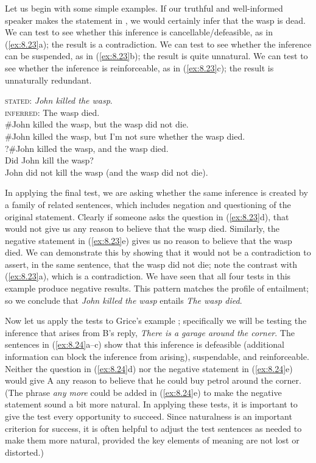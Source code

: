 Let us begin with some simple examples. If our truthful and well-informed speaker makes the statement in , we would certainly infer that the wasp is dead. We can test to see whether this inference is cancellable/defeasible, as in (\ref{ex:8.23}a); the result is a contradiction. We can test to see whether the inference can be suspended, as in (\ref{ex:8.23}b); the result is quite unnatural. We can test to see whether the inference is reinforceable, as in (\ref{ex:8.23}c); the result is unnaturally redundant.


\ea \label{ex:8.23}
\textsc{stated}: \textit{John killed the wasp}.\\
\textsc{inferred}: The wasp died.\\
\ea \#John killed the wasp, but the wasp did not die.\\
\ex \#John killed the wasp, but I’m not sure whether the wasp died.\\
\ex ?\#John killed the wasp, and the wasp died.\\
\ex Did John kill the wasp?\\
\ex John did not kill the wasp (and the wasp did not die).
                       \z
\z


In applying the final test, we are asking whether the same inference is created by a family of related sentences, which includes negation and questioning of the original statement. Clearly if someone asks the question in (\ref{ex:8.23}d), that would not give us any reason to believe that the wasp died. Similarly, the negative statement in (\ref{ex:8.23}e) gives us no reason to believe that the wasp died. We can demonstrate this by showing that it would not be a contradiction to assert, in the same sentence, that the wasp did not die; note the contrast with (\ref{ex:8.23}a), which is a contradiction. We have seen that all four tests in this example produce negative results. This pattern matches the profile of entailment; so we conclude that \textit{John killed the wasp} entails \textit{The wasp died}.



Now let us apply the tests to Grice’s example ; specifically we will be testing the inference that arises from B’s reply, \textit{There is a garage around the corner}. The sentences in (\ref{ex:8.24}a--c) show that this inference is defeasible (additional information can block the inference from arising), suspendable, and reinforceable. Neither the question in (\ref{ex:8.24}d) nor the negative statement in (\ref{ex:8.24}e) would give A any reason to believe that he could buy petrol around the corner. (The phrase \textit{any more} could be added in (\ref{ex:8.24}e) to make the negative statement sound a bit more natural. In applying these tests, it is important to give the test every opportunity to succeed. Since naturalness is an important criterion for success, it is often helpful to adjust the test sentences as needed to make them more natural, provided the key elements of meaning are not lost or distorted.)


